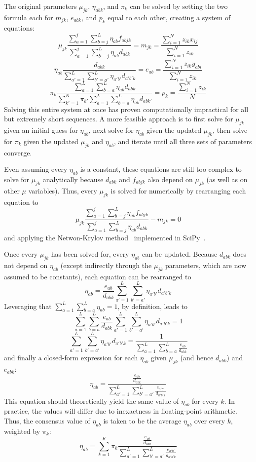 \documentclass[main.tex]{subfiles}
\begin{document}
The original parameters $\mu_{jk}$, $\eta_{abk}$, and $\pi_k$ can be solved by setting the two formula each for $m_{jk}$, $e_{abk}$, and $p_k$ equal to each other, creating a system of equations:
$$\mu_{jk} \frac{\sum_{a=1}^{j}\sum_{b=j}^{L}\eta_{ab} f_{abjk}}{\sum_{a=1}^{j}\sum_{b=j}^{L}\eta_{ab}d_{abk}} = m_{jk} = \frac{\sum_{i=1}^{N} z_{ik} x_{ij}}{\sum_{i=1}^{N} z_{ik}}$$
$$\eta_{ab} \frac{d_{abk}}{\sum_{a'=1}^{L} \sum_{b'=a'}^{L} \eta_{a'b'} d_{a'b'k}} = e_{ab} = \frac{\sum_{i=1}^{N} z_{ik} y_{abi}}{\sum_{i=1}^{N} z_{ik}}$$
$$\pi_k \frac{\sum_{a=1}^{L} \sum_{b=a}^{L} \eta_{ab} d_{abk}}{\sum_{k'=1}^{K} \pi_{k'} \sum_{a=1}^{L} \sum_{b=a}^{L} \eta_{ab} d_{abk'}} = p_k = \frac{\sum_{i=1}^{N} z_{ik}}{N}$$
Solving this entire system at once has proven computationally impractical for all but extremely short sequences.
A more feasible approach is to first solve for $\mu_{jk}$ given an initial guess for $\eta_{ab}$, next solve for $\eta_{ab}$ given the updated $\mu_{jk}$, then solve for $\pi_k$ given the updated $\mu_{jk}$ and $\eta_{ab}$, and iterate until all three sets of parameters converge.

Even assuming every $\eta_{ab}$ is a constant, these equations are still too complex to solve for $\mu_{jk}$ analytically because $d_{abk}$ and $f_{abjk}$ also depend on $\mu_{jk}$ (as well as on other $\mu$ variables).
Thus, every $\mu_{jk}$ is solved for numerically by rearranging each equation to
$$\mu_{jk} \frac{\sum_{a=1}^{j}\sum_{b=j}^{L}\eta_{ab} f_{abjk}}{\sum_{a=1}^{j}\sum_{b=j}^{L}\eta_{ab}d_{abk}} - m_{jk} = 0$$
and applying the Netwon-Krylov method~\cite{Knoll2004} implemented in SciPy~\cite{Virtanen2020}.

Once every $\mu_{jk}$ has been solved for, every $\eta_{ab}$ can be updated.
Because $d_{abk}$ does not depend on $\eta_{ab}$ (except indirectly through the $\mu_{jk}$ parameters, which are now assumed to be constants), each equation can be rearranged to
$$\eta_{ab} = \frac{e_{ab}}{d_{abk}} \sum_{a'=1}^{L} \sum_{b'=a'}^{L} \eta_{a'b'} d_{a'b'k}$$
Leveraging that $\sum_{a=1}^{L} \sum_{b=a}^{L} \eta_{ab} = 1$, by definition, leads to
$$\sum_{a=1}^{L} \sum_{b=a}^{L} \frac{e_{ab}}{d_{abk}} \sum_{a'=1}^{L} \sum_{b'=a'}^{L} \eta_{a'b'} d_{a'b'k} = 1$$
$$\sum_{a'=1}^{L} \sum_{b'=a'}^{L} \eta_{a'b'} d_{a'b'k} = \frac{1}{\sum_{a=1}^{L} \sum_{b=a}^{L} \frac{e_{ab}}{d_{abk}}}$$
and finally a closed-form expression for each $\eta_{ab}$ given $\mu_{jk}$ (and hence $d_{abk}$) and $e_{abk}$:
$$\eta_{ab} = \frac{\frac{e_{ab}}{d_{abk}}}{\sum_{a'=1}^{L} \sum_{b'=a'}^{L} \frac{e_{a'b'}}{d_{a'b'k}}}$$
This equation should theoretically yield the same value of $\eta_{ab}$ for every $k$.
In practice, the values will differ due to inexactness in floating-point arithmetic.
Thus, the consensus value of $\eta_{ab}$ is taken to be the average $\eta_{ab}$ over every $k$, weighted by $\pi_k$:
$$\eta_{ab} = \sum_{k=1}^{K} \pi_k \frac{\frac{e_{ab}}{d_{abk}}}{\sum_{a'=1}^{L} \sum_{b'=a'}^{L} \frac{e_{a'b'}}{d_{a'b'k}}}$$
\end{document}
